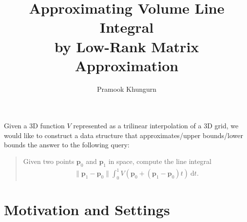 \documentclass[10pt]{article}
\title{Approximating Volume Line Integral\\
by Low-Rank Matrix Approximation}
\author{Pramook Khungurn}
\newcommand{\dee}{\mathrm{d}}
\begin{document}
	\maketitle
		
	Given a 3D function $V$ represented as a trilinear interpolation
	of a 3D grid, we would like to construct a data structure that 
	approximates/upper bounds/lower bounds the answer to 
	the following query:
	
	\begin{quote}
	    Given two points $\mathbf{p}_0$ and $\mathbf{p}_1$ in
	    space, compute the line integral
	    \begin{align} \label{line-integral}
	        \| \mathbf{p}_1 - \mathbf{p}_0 \| \int_0^1 V(\mathbf{p}_0 + (\mathbf{p}_1 - \mathbf{p}_0)t ) \ \dee t.
	    \end{align}
	\end{quote}
	
\section{Motivation and Settings}
\end{document}
